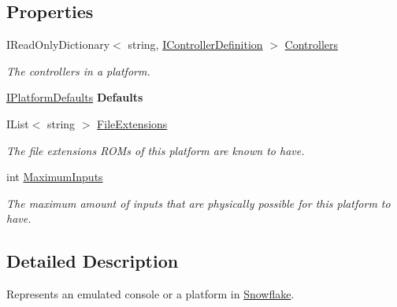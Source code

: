 \subsection*{Properties}
\begin{DoxyCompactItemize}
\item 
I\+Read\+Only\+Dictionary$<$ string, \hyperlink{interface_snowflake_1_1_controller_1_1_i_controller_definition}{I\+Controller\+Definition} $>$ \hyperlink{interface_snowflake_1_1_platform_1_1_i_platform_info_a1151f29fd2b955e694257a3ea83b19eb}{Controllers}
\begin{DoxyCompactList}\small\item\em The controllers in a platform. \end{DoxyCompactList}\item 
\hypertarget{interface_snowflake_1_1_platform_1_1_i_platform_info_a0ce0061b2706d418974f14552cf33f38}{}\hyperlink{interface_snowflake_1_1_platform_1_1_i_platform_defaults}{I\+Platform\+Defaults} {\bfseries Defaults}\label{interface_snowflake_1_1_platform_1_1_i_platform_info_a0ce0061b2706d418974f14552cf33f38}

\item 
I\+List$<$ string $>$ \hyperlink{interface_snowflake_1_1_platform_1_1_i_platform_info_a2e12201a96a5804f7f97dc3239d6a4d3}{File\+Extensions}
\begin{DoxyCompactList}\small\item\em The file extensions R\+O\+Ms of this platform are known to have. \end{DoxyCompactList}\item 
int \hyperlink{interface_snowflake_1_1_platform_1_1_i_platform_info_a3d087c38d145982e8fb26d5adbaaf545}{Maximum\+Inputs}
\begin{DoxyCompactList}\small\item\em The maximum amount of inputs that are physically possible for this platform to have. \end{DoxyCompactList}\end{DoxyCompactItemize}


\subsection{Detailed Description}
Represents an emulated console or a platform in \hyperlink{namespace_snowflake}{Snowflake}. 



